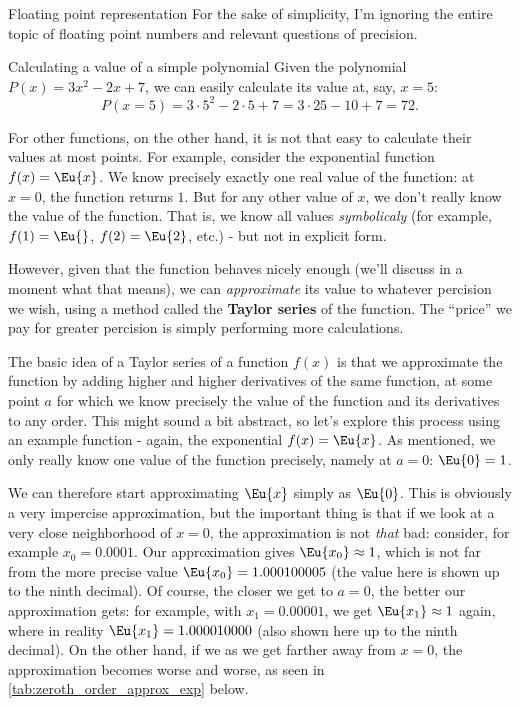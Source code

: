 \begin{note}{Floating point representation}{}
  For the sake of simplicity, I'm ignoring the entire topic of floating point numbers and relevant questions of precision.
\end{note}

\begin{example}{Calculating a value of a simple polynomial}{}
  Given the polynomial $P(x)=3x^{2}-2x+7$, we can easily calculate its value at, say, $x=5$:
  \[
    P(x=5) = 3\cdot5^{2}-2\cdot5+7 = 3\cdot25-10+7 = 72.
  \]
\end{example}

For other functions, on the other hand, it is not that easy to calculate their values at most points. For example, consider the exponential function $f(x)=\Eu{x}$. We know precisely exactly one real value of the function: at $x=0$, the function returns $1$. But for any other value of $x$, we don't really know the value of the function. That is, we know all values \textit{symbolicaly} (for example, $f(1)=\Eu{}$, $f(2)=\Eu{2}$, etc.) - but not in explicit form.

However, given that the function behaves nicely enough (we'll discuss in a moment what that means), we can \textit{approximate} its value to whatever percision we wish, using a method called the \textbf{Taylor series} of the function. The \enquote{price} we pay for greater percision is simply performing more calculations.

The basic idea of a Taylor series of a function $f(x)$ is that we approximate the function by adding higher and higher derivatives of the same function, at some point $a$ for which we know precisely the value of the function and its derivatives to any order. This might sound a bit abstract, so let's explore this process using an example function - again, the exponential $f(x)=\Eu{x}$. As mentioned, we only really know one value of the function precisely, namely at $a=0$: $\Eu{0}=1$.

We can therefore start approximating $\Eu{x}$ simply as $\Eu{0}$. This is obviously a very impercise approximation, but the important thing is that if we look at a very close neighborhood of $x=0$, the approximation is not \textit{that} bad: consider, for example $x_{0}=0.0001$. Our approximation gives $\Eu{x_{0}}\approx1$, which is not far from the more precise value $\Eu{x_{0}}=1.000100005$ (the value here is shown up to the ninth decimal). Of course, the closer we get to $a=0$, the better our approximation gets: for example, with $x_{1}=0.00001$, we get $\Eu{x_{1}}\approx1$ again, where in reality $\Eu{x_{1}}=1.000010000$ (also shown here up to the ninth decimal). On the other hand, if we as we get farther away from $x=0$, the approximation becomes worse and worse, as seen in \autoref{tab:zeroth_order_approx_exp} below.

